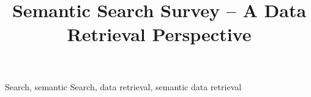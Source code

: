 \documentclass{elsart3p}    %
\begin{document}
\begin{frontmatter}

\title{Semantic Search Survey -- A Data Retrieval Perspective}




\medskip



\begin{abstract}
\end{abstract}


\begin{keyword}
Search, semantic Search, data retrieval, semantic data retrieval
\end{keyword}
\end{frontmatter}












\clearpage
\end{document}
